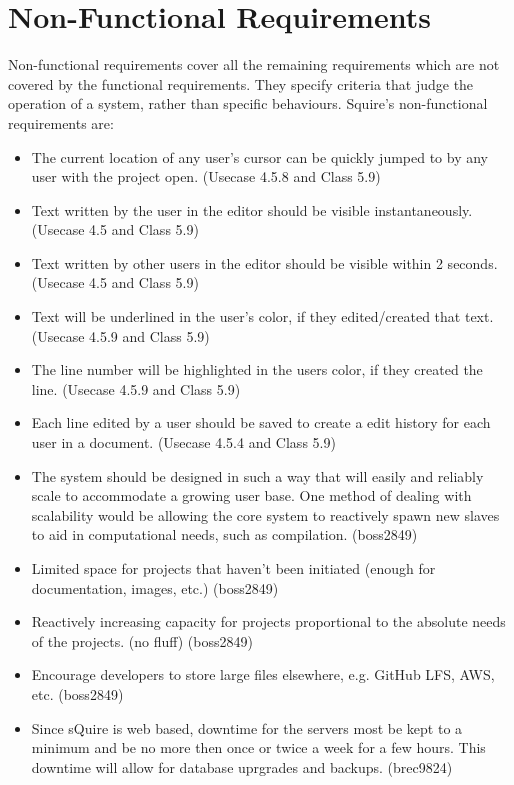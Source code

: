 \documentclass[11pt]{report}
\begin{document}
\section{Non-Functional Requirements}
    Non-functional requirements cover all the remaining requirements which are not covered by the functional requirements. They specify criteria that judge the operation of a system, rather than specific behaviours. Squire's non-functional requirements are:
    \begin{itemize}
        \item The current location of any user's cursor can be quickly jumped to by any user with the project open. (Usecase 4.5.8 and Class 5.9)
        \item Text written by the user in the editor should be visible instantaneously. (Usecase 4.5 and Class 5.9)
        \item Text written by other users in the editor should be visible within 2 seconds. (Usecase 4.5 and Class 5.9)
        \item Text will be underlined in the user's color, if they edited/created that text. (Usecase 4.5.9 and Class 5.9)
        \item The line number will be highlighted in the users color, if they created the line. (Usecase 4.5.9 and Class 5.9)
        \item Each line edited by a user should be saved to create a edit history for each user in a document. (Usecase 4.5.4 and Class 5.9)
        \item The system should be designed in such a way that will easily and reliably scale to accommodate a growing user base. One method of dealing with scalability would be allowing the core system to reactively spawn new slaves to aid in computational needs, such as compilation. (boss2849)
        \item Limited space for projects that haven't been initiated (enough for documentation, images, etc.) (boss2849)
        \item Reactively increasing capacity for projects proportional to the absolute needs of the projects. (no fluff) (boss2849)
        \item Encourage developers to store large files elsewhere, e.g. GitHub LFS, AWS, etc. (boss2849)
        \item Since sQuire is web based, downtime for the servers most be kept to a minimum and be no more then once or twice a week for a few hours. This downtime will allow for database uprgrades and backups. (brec9824)

\end{itemize}
\end{document}
